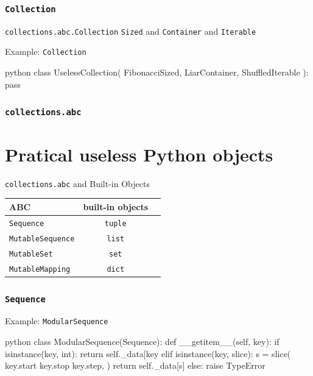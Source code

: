 \documentclass[aspectratio=169,dvipdfmx,12pt,notheorems]{beamer}
\theoremstyle{definition}
\begin{document}
\begin{frame}[fragile]\frametitle{\texttt{Collection}}

\begin{block}{\texttt{collections.abc.Collection}}
\texttt{Sized} and \texttt{Container} and \texttt{Iterable}
\end{block}

\begin{exampleblock}{Example: \texttt{Collection}}
\begin{pygments}{python}
class UselessCollection(
    FibonacciSized, LiarContainer, ShuffledIterable
):
    pass
\end{pygments}
\end{exampleblock}

\end{frame}

\begin{frame}\frametitle{\texttt{collections.abc}}

\section{Pratical useless Python objects}

\begin{exampleblock}{\texttt{collections.abc} and Built-in Objects}
\begin{table}[h]
\centering
\begin{tabular}{lcr}
\hline
ABC  & built-in objects \\
\hline
\texttt{Sequence}  & \texttt{tuple} \\
\texttt{MutableSequence}  & \texttt{list} \\
\texttt{MutableSet}  &  \texttt{set} \\
\texttt{MutableMapping}  & \texttt{dict}  \\
\hline
\end{tabular}
\end{table}
\end{exampleblock}

\end{frame}

\begin{frame}[fragile,shrink=10]\frametitle{\texttt{Sequence}}

\begin{exampleblock}{Example: \texttt{ModularSequence}}
\begin{pygments}{python}
class ModularSequence(Sequence):
    def __getitem__(self, key):
        if isinstance(key, int):
            return self._data[key %
        elif isinstance(key, slice):
            s = slice(
                key.start %
                key.stop %
                key.step,
            )
            return self._data[s]
        else:
            raise TypeError
\end{pygments}
\end{exampleblock}

\end{frame}
\end{document}
